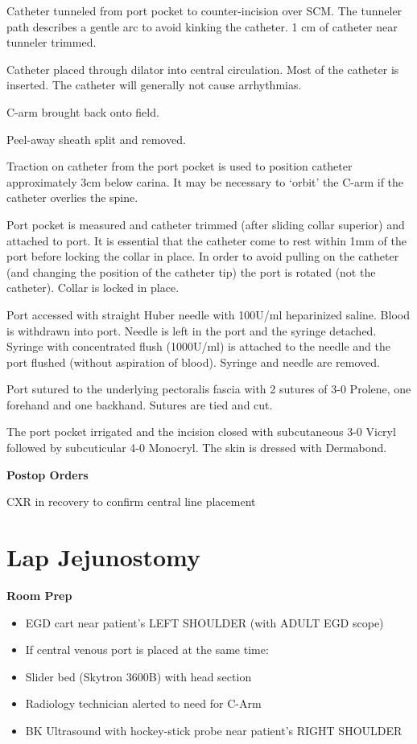 \documentclass[
]{book}
\providecommand{\tightlist}{%
  \setlength{\itemsep}{0pt}\setlength{\parskip}{0pt}}
\begin{document}
Catheter tunneled from port pocket to counter-incision over SCM. The tunneler path describes a gentle arc to avoid kinking the catheter. 1 cm of catheter near tunneler trimmed.

Catheter placed through dilator into central circulation. Most of the catheter is inserted. The catheter will generally not cause arrhythmias.

C-arm brought back onto field.

Peel-away sheath split and removed.

Traction on catheter from the port pocket is used to position catheter approximately 3cm below carina. It may be necessary to `orbit' the C-arm if the catheter overlies the spine.

Port pocket is measured and catheter trimmed (after sliding collar superior) and attached to port. It is essential that the catheter come to rest within 1mm of the port before locking the collar in place. In order to avoid pulling on the catheter (and changing the position of the catheter tip) the port is rotated (not the catheter). Collar is locked in place.

Port accessed with straight Huber needle with 100U/ml heparinized saline. Blood is withdrawn into port. Needle is left in the port and the syringe detached. Syringe with concentrated flush (1000U/ml) is attached to the needle and the port flushed (without aspiration of blood). Syringe and needle are removed.

Port sutured to the underlying pectoralis fascia with 2 sutures of 3-0 Prolene, one forehand and one backhand. Sutures are tied and cut.

The port pocket irrigated and the incision closed with subcutaneous 3-0 Vicryl followed by subcuticular 4-0 Monocryl. The skin is dressed with Dermabond.

\textbf{Postop Orders}

CXR in recovery to confirm central line placement

\hypertarget{lap-jejunostomy}{%
\chapter{Lap Jejunostomy}\label{lap-jejunostomy}}

\textbf{Room Prep}

\begin{itemize}
\tightlist
\item
  EGD cart near patient's LEFT SHOULDER (with ADULT EGD scope)
\item
  If central venous port is placed at the same time:
\item
  Slider bed (Skytron 3600B) with head section
\item
  Radiology technician alerted to need for C-Arm
\item
  BK Ultrasound with hockey-stick probe near patient's RIGHT SHOULDER
\end{itemize}
\end{document}
